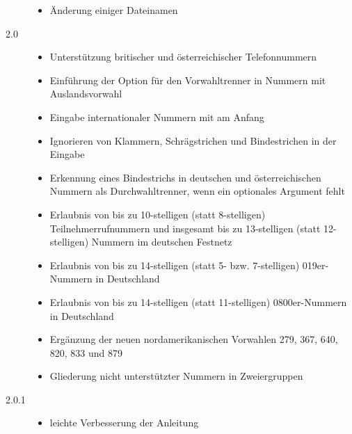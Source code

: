 \documentclass[numbers=noenddot]{scrreprt}
\begin{document}
\begin{description}
\begin{itemize}
\item Änderung einiger Dateinamen
\end{itemize}
\item[2.0] 
\begin{itemize}
\item Unterstützung britischer und österreichischer Telefonnummern
\item Einführung der Option
für den Vorwahltrenner in Nummern mit Auslandsvorwahl
\item Eingabe internationaler Nummern mit
am Anfang
\item Ignorieren von Klammern, Schrägstrichen und Bindestrichen in der Eingabe
\item Erkennung eines Bindestrichs in deutschen und österreichischen Nummern als Durchwahltrenner, wenn ein optionales Argument fehlt
\item Erlaubnis von bis zu 10-stelligen (statt 8-stelligen) Teilnehmerrufnummern und insgesamt bis zu 13-stelligen (statt 12-stelligen) Nummern im deutschen Festnetz
\item Erlaubnis von bis zu 14-stelligen (statt 5- bzw. 7-stelligen) 019er-Nummern in Deutschland
\item Erlaubnis von bis zu 14-stelligen (statt 11-stelligen) 0800er-Nummern in Deutschland
\item Ergänzung der neuen nordamerikanischen Vorwahlen 279, 367, 640, 820, 833 und 879
\item Gliederung nicht unterstützter Nummern in Zweiergruppen
\end{itemize}
\item[2.0.1] 
\begin{itemize}
\item leichte Verbesserung der Anleitung
\end{itemize}

\end{description}
\end{document}
